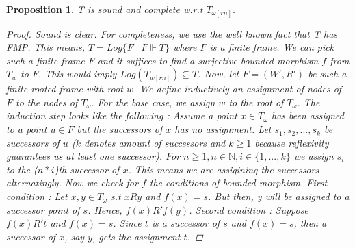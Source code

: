 \documentclass[12pt, a4paper]{scrartcl}
\newtheorem{proposition}[definition]{Proposition}
\begin{document}
\begin{proposition}
    T is sound and complete w.r.t $T_{\omega[rn]}$.

    \begin{proof}
    Sound is clear. For completeness, we use the well known fact that T has FMP. This means, $T = Log\{F \mid F \Vdash T\}$ where $F$ is a finite frame.
    We can pick such a finite frame $F$ and it suffices to find a surjective bounded morphism $f$ from $T_w$ to $F$. This would imply $Log(T_{w[rn]}) \subseteq T$. \newline
    Now, let $F = (W', R')$ be such a finite rooted frame with root $w$. We define 
    inductively an assignment of nodes of $F$ to the nodes of $T_\omega$. For the base case, we assign $w$ to the root of $T_\omega$. The induction step looks like the following : 
    Assume a point $x \in T_\omega$ has been assigned to a point $u \in F$ but the successors of $x$ has no assignment. 
    Let $s_1, s_2, ..., s_k$ be successors of $u$ ($k$ denotes amount of successors and $k\geq 1$ because reflexivity guarantees us at least one successor).
    For $n \geq 1, n \in \mathbb{N}, i \in\{1,...,k\}$ we assign $s_i$ to the ($n * i$)th-successor of $x$. This means we are assigining the successors alternatingly. \newline
    Now we check for $f$ the conditions of bounded morphism. First condition : Let $x,y \in T_\omega$ s.t $xRy$ and $f(x) = s$. But then, y will be assigned to a successor point of $s$. 
    Hence, $f(x) R'f(y)$. Second condition : Suppose $f(x)R't$ and $f(x) = s$. Since $t$ is a successor of $s$ and $f(x) = s$, then a successor of $x$, say $y$, gets the assignment $t$. 
    
    \end{proof}
        
\end{proposition}
\end{document}
